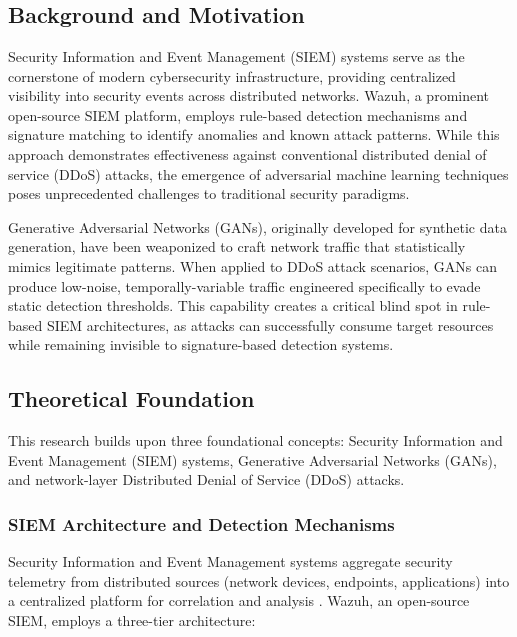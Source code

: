 \section{\chapterone}

\subsection{Background and Motivation}

Security Information and Event Management (SIEM) systems serve as the cornerstone of modern cybersecurity infrastructure, providing centralized visibility into security events across distributed networks. Wazuh, a prominent open-source SIEM platform, employs rule-based detection mechanisms and signature matching to identify anomalies and known attack patterns. While this approach demonstrates effectiveness against conventional distributed denial of service (DDoS) attacks, the emergence of adversarial machine learning techniques poses unprecedented challenges to traditional security paradigms.

Generative Adversarial Networks (GANs), originally developed for synthetic data generation, have been weaponized to craft network traffic that statistically mimics legitimate patterns. When applied to DDoS attack scenarios, GANs can produce low-noise, temporally-variable traffic engineered specifically to evade static detection thresholds. This capability creates a critical blind spot in rule-based SIEM architectures, as attacks can successfully consume target resources while remaining invisible to signature-based detection systems.

\subsection{Theoretical Foundation}

This research builds upon three foundational concepts: Security Information and Event Management (SIEM) systems, Generative Adversarial Networks (GANs), and network-layer Distributed Denial of Service (DDoS) attacks.

\subsubsection{SIEM Architecture and Detection Mechanisms}

Security Information and Event Management systems aggregate security telemetry from distributed sources (network devices, endpoints, applications) into a centralized platform for correlation and analysis \cite{kumar2021}. Wazuh, an open-source SIEM, employs a three-tier architecture:

